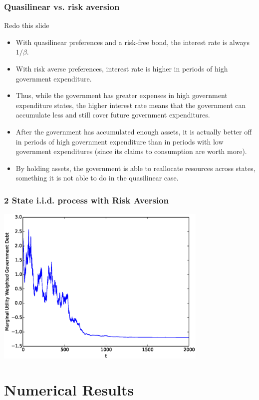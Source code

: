 \documentclass{beamer}
\begin{document}
%
\begin{frame}
	\frametitle{Quasilinear vs. risk aversion}
	{\color{red} Redo this slide}
	\begin{itemize}
				\item  With  quasilinear preferences and a risk-free bond, the interest rate is always $1/\beta$.
   \item With risk averse preferences, interest rate is higher in periods of high government expenditure.
		\item  Thus, while the government has greater expenses in high government expenditure states, the higher interest rate means that the government can  accumulate less and still  cover future government expenditures.
		\item  After the government has accumulated enough assets, it is actually better off in periods of high government expenditure than in periods with low government expenditures (since its claims to consumption are worth more).
		\item  By holding assets, the government is able to reallocate resources across states, something it is not able to do in the quasilinear case.
	\end{itemize}
\end{frame}

\begin{frame}
	\frametitle{2 State i.i.d. process with Risk Aversion}
	\begin{center}
	\includegraphics[width=4in]{Images/2stateiid.eps}
	\end{center}
\end{frame}

\section{Numerical Results}
\end{document}
